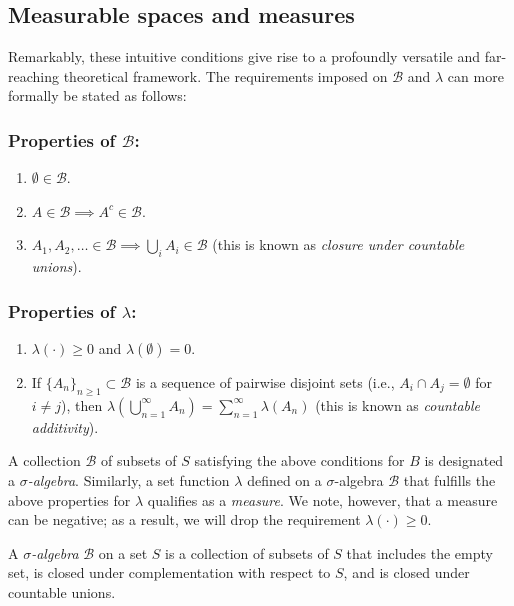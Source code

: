 \subsection{Measurable spaces and measures}
Remarkably, these  intuitive conditions give rise to a profoundly versatile and far-reaching theoretical framework. The requirements imposed on $\mathcal{B}$ and $\lambda$ can more formally be stated as follows:

\subsubsection*{Properties of $\mathcal{B}$:}
\begin{enumerate}
    \item $\emptyset \in \mathcal{B}$.
    \item $A \in \mathcal{B}  \implies A^c \in \mathcal{B}$. 
    \item  $A_1, A_2, \dots \in \mathcal{B} \implies \bigcup_i A_i \in \mathcal{B}$ (this is known as \emph{closure
 under countable unions}).
\end{enumerate}

\subsubsection*{Properties of $\lambda$:}
\begin{enumerate}
    \item $\lambda(\cdot) \geq 0$  and $\lambda(\emptyset) = 0$.
    \item  If \(\{A_n\}_{n \geq 1} \subset \mathcal{B}\) is a sequence of pairwise disjoint sets (i.e., \(A_i \cap A_j = \emptyset\) for \(i \neq j\)), then
    $\lambda\left( \bigcup_{n=1}^\infty A_n \right) = \sum_{n=1}^\infty \lambda(A_n)$ (this is known as \emph{countable additivity}). 
\end{enumerate}

A collection $\mathcal{B}$ of subsets of $S$ satisfying the above conditions for $B$ is designated a $\sigma$\emph{-algebra}. Similarly, a set function $\lambda$ defined on a $\sigma$-algebra $\mathcal{B}$ that fulfills the above properties for $\lambda$ qualifies as a \emph{measure}. We note, however, that a measure can be negative; as a result, we will drop the requirement $\lambda(\cdot) \geq 0$.


\begin{definition} 
  A $\sigma$\emph{-algebra} $\mathcal{B}$ on a set $S$ is a collection of subsets of $S$ that includes the empty set, is closed under complementation with respect to $S$, and is closed under countable unions. 
\end{definition}

